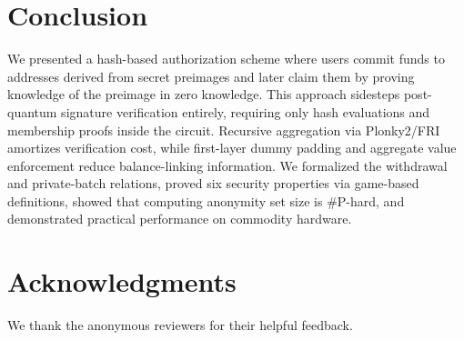 \documentclass{iacrcc}
\begin{document}
\section{Conclusion}
\label{sec:conclusion}

We presented a hash-based authorization scheme where users commit funds to addresses derived from secret preimages and later claim them by proving knowledge of the preimage in zero knowledge. This approach sidesteps post-quantum signature verification entirely, requiring only hash evaluations and membership proofs inside the circuit. Recursive aggregation via Plonky2/FRI amortizes verification cost, while first-layer dummy padding and aggregate value enforcement reduce balance-linking information. We formalized the withdrawal and private-batch relations, proved six security properties via game-based definitions, showed that computing anonymity set size is \#P-hard, and demonstrated practical performance on commodity hardware.

\section*{Acknowledgments}

We thank the anonymous reviewers for their helpful feedback.
\end{document}

